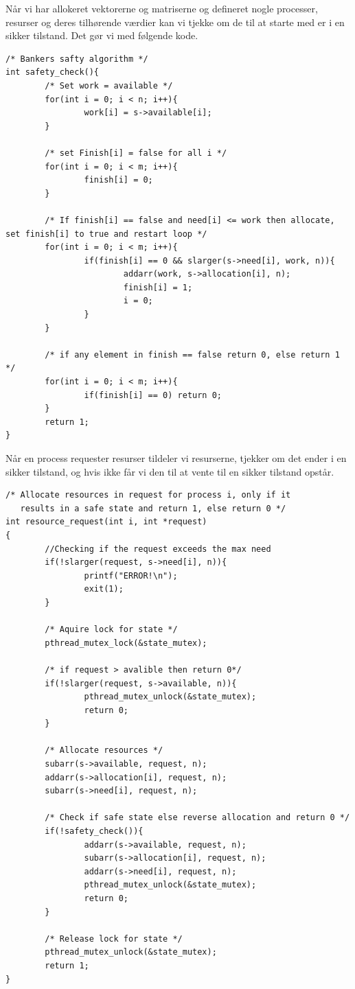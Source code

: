 \documentclass[danish]{report}
\begin{document}
Når vi har allokeret vektorerne og matriserne og defineret nogle processer, resurser og deres tilhørende værdier kan vi tjekke om de til at starte med er i en sikker tilstand. Det gør vi med følgende kode.

\begin{lstlisting}
/* Bankers safty algorithm */
int safety_check(){
        /* Set work = available */
        for(int i = 0; i < n; i++){
                work[i] = s->available[i];
        }

        /* set Finish[i] = false for all i */
        for(int i = 0; i < m; i++){
                finish[i] = 0;
        }

        /* If finish[i] == false and need[i] <= work then allocate, set finish[i] to true and restart loop */
        for(int i = 0; i < m; i++){
                if(finish[i] == 0 && slarger(s->need[i], work, n)){
                        addarr(work, s->allocation[i], n);
                        finish[i] = 1;
                        i = 0;
                }
        }

        /* if any element in finish == false return 0, else return 1  */
        for(int i = 0; i < m; i++){
                if(finish[i] == 0) return 0;
        }
        return 1;
}
\end{lstlisting}


Når en process requester resurser tildeler vi resurserne, tjekker om det ender i en sikker tilstand, og hvis ikke får vi den til at vente til en sikker tilstand opstår.

\begin{lstlisting}
/* Allocate resources in request for process i, only if it
   results in a safe state and return 1, else return 0 */
int resource_request(int i, int *request)
{
        //Checking if the request exceeds the max need
        if(!slarger(request, s->need[i], n)){
                printf("ERROR!\n");
                exit(1);
        }

        /* Aquire lock for state */
        pthread_mutex_lock(&state_mutex);

        /* if request > avalible then return 0*/
        if(!slarger(request, s->available, n)){
                pthread_mutex_unlock(&state_mutex);
                return 0;
        }

        /* Allocate resources */
        subarr(s->available, request, n);
        addarr(s->allocation[i], request, n);
        subarr(s->need[i], request, n);

        /* Check if safe state else reverse allocation and return 0 */
        if(!safety_check()){
                addarr(s->available, request, n);
                subarr(s->allocation[i], request, n);
                addarr(s->need[i], request, n);
                pthread_mutex_unlock(&state_mutex);
                return 0;
        }

        /* Release lock for state */
        pthread_mutex_unlock(&state_mutex);
        return 1;
}
\end{lstlisting}
\end{document}
